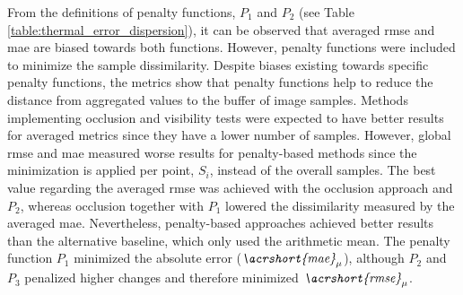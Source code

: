 From the definitions of penalty functions, $P_1$ and $P_2$ (see Table \ref{table:thermal_error_dispersion}), it can be observed that averaged \acrshort{rmse} and \acrshort{mae} are biased towards both functions. However, penalty functions were included to minimize the sample dissimilarity. Despite biases existing towards specific penalty functions,  the metrics show that penalty functions help to reduce the distance from aggregated values to the buffer of image samples. Methods implementing occlusion and visibility tests were expected to have better results for averaged metrics since they have a lower number of samples. However, global \acrshort{rmse} and \acrshort{mae} measured worse results for penalty-based methods since the minimization is applied per point, $S_i$, instead of the overall samples. The best value regarding the averaged \acrshort{rmse} was achieved with the occlusion approach and $P_2$, whereas occlusion together with $P_1$ lowered the dissimilarity measured by the averaged \acrshort{mae}. Nevertheless, penalty-based approaches achieved better results than the alternative baseline, which only used the arithmetic mean. The penalty function $P_1$ minimized the absolute error ($\textit{\acrshort{mae}}_{\mu}$), although $P_2$ and $P_3$ penalized higher changes and therefore minimized $\textit{\acrshort{rmse}}_{\mu}$.

